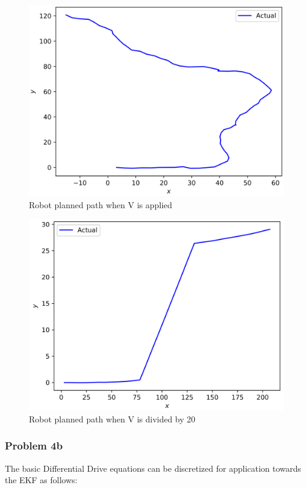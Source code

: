 \documentclass{article}
\begin{document}
\begin{figure}[h]
    \centering
    \includegraphics[scale=0.75]{problem17_4a_Vnoise_bad}
    \caption[Robot Planned Path (bad)]{Robot planned path when V is applied}
    \label{fig:p17_4a_vnoise_bad}
\end{figure}

\begin{figure}[h]
    \centering
    \includegraphics[scale=0.75]{problem17_4a_Vnoise_good}
    \caption[Robot Planned Path (good)]{Robot planned path when V is divided by 20}
    \label{fig:p17_4a_vnoise_good}
\end{figure}

\subsubsection{Problem 4b}
The basic Differential Drive equations can be discretized for application 
towards the EKF as follows:
\end{document}
